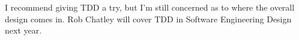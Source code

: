 \documentclass[aspectratio=169]{beamer}
\begin{document}
\begin{frame}[fragile]
\begin{columns}
\begin{center}
\begin{tikzpicture}
	\end{tikzpicture}
	\end{center}

\end{columns}

    \pause
    \pause
    \pause
    \pause
    \pause
    \pause
    \vspace{10pt}
    I recommend giving TDD a try, but I'm still concerned as to where
    the overall design comes in.
    Rob Chatley will cover TDD in
    Software Engineering Design next year.

\end{frame}
\end{document}
